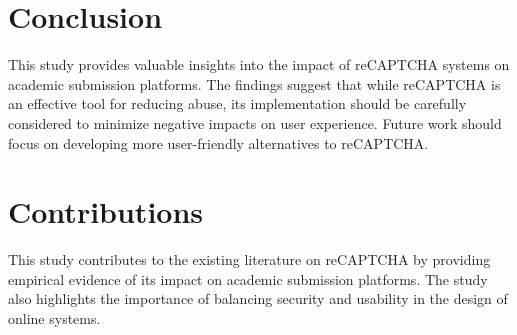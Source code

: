 \documentclass{article}
\begin{document}
\section{Conclusion}
This study provides valuable insights into the impact of reCAPTCHA systems on academic submission platforms. The findings suggest that while reCAPTCHA is an effective tool for reducing abuse, its implementation should be carefully considered to minimize negative impacts on user experience. Future work should focus on developing more user-friendly alternatives to reCAPTCHA.

\section{Contributions}
This study contributes to the existing literature on reCAPTCHA by providing empirical evidence of its impact on academic submission platforms. The study also highlights the importance of balancing security and usability in the design of online systems.



\end{document}
